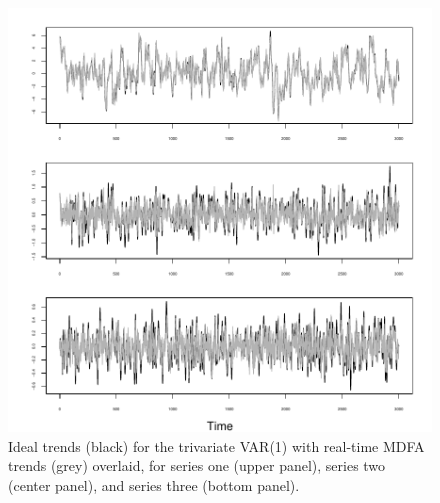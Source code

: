 \documentclass[a4paper]{book}
\begin{document}
\begin{figure}[htb!]
\begin{center}
\includegraphics[]{mdfa_trivar1_filtering.pdf}
\caption{Ideal trends (black) for the trivariate VAR(1)
	with real-time MDFA trends (grey) overlaid, for series one (upper panel),
	series two (center panel), and series three (bottom panel).}
\label{fig:trivar1.trends} 
\end{center}
\end{figure}
\end{document}
